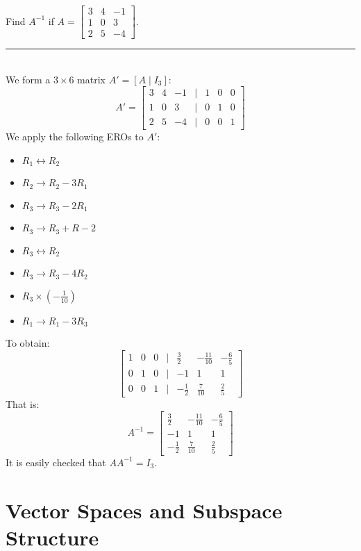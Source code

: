 \documentclass[a4paper, 9pt]{extarticle}
\begin{document}
\begin{examplebox}{}{}
  Find $A^{-1}$ if $A = \begin{bmatrix}
      3 & 4 & -1 \\
      1 & 0 & 3  \\
      2 & 5 & -4
    \end{bmatrix}$.
  \\[2ex] \rule{\textwidth}{1px} \\
  We form a $3 \times 6$ matrix $A' = [A \mid I_3]$:
  $$
    A' = \begin{bmatrix}
      3 & 4 & -1 & | & 1 & 0 & 0 \\
      1 & 0 & 3  & | & 0 & 1 & 0 \\
      2 & 5 & -4 & | & 0 & 0 & 1
    \end{bmatrix}
  $$
  We apply the following EROs to $A'$:
  \begin{itemize}
    \item $R_1 \leftrightarrow R_2$
    \item $R_2 \rightarrow R_2 - 3R_1$
    \item $R_3 \rightarrow R_3 - 2R_1$
    \item $R_3 \rightarrow R_3 + R-2$
    \item $R_3 \leftrightarrow R_2$
    \item $R_3 \rightarrow R_3 - 4R_2$
    \item $R_3 \times (-\frac{1}{10})$
    \item $R_1 \rightarrow R_1 - 3R_3$
  \end{itemize}
  To obtain:
  $$
    \begin{bmatrix}
      1 & 0 & 0 & | & \frac{3}{2}  & -\frac{11}{10} & -\frac{6}{5} \\
      0 & 1 & 0 & | & -1           & 1              & 1            \\
      0 & 0 & 1 & | & -\frac{1}{2} & \frac{7}{10}   & \frac{2}{5}
    \end{bmatrix}
  $$
  That is:
  $$A^{-1} = \begin{bmatrix}
      \frac{3}{2}  & -\frac{11}{10} & -\frac{6}{5} \\
      -1           & 1              & 1            \\
      -\frac{1}{2} & \frac{7}{10}   & \frac{2}{5}
    \end{bmatrix}$$
  It is easily checked that $AA^{-1} = I_3$.
\end{examplebox}
\pagebreak
\section{Vector Spaces and Subspace Structure}
\end{document}
